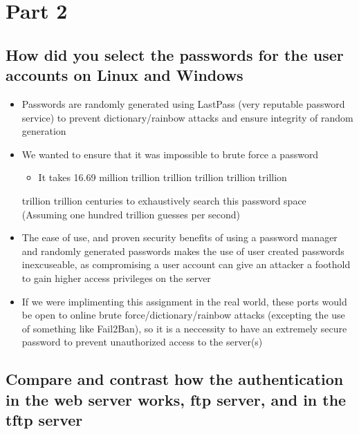 \documentclass[11pt]{article}
\begin{document}
\section{Part 2}
\label{sec-3}
\subsection{How did you select the passwords for the user accounts on Linux and Windows}
\label{sec-3-1}
\begin{itemize}
\item Passwords are randomly generated using LastPass (very reputable password
service) to prevent dictionary/rainbow attacks and ensure integrity of random
generation
\item We wanted to ensure that it was impossible to brute force a password
\begin{itemize}
\item It takes 16.69 million trillion trillion trillion trillion trillion
\end{itemize}
trillion trillion centuries to exhaustively search this password space
(Assuming one hundred trillion guesses per second)
\item The ease of use, and proven security benefits of using a password manager
and randomly generated passwords makes the use of user created passwords
inexcuseable, as compromising a user account can give an attacker a
foothold to gain higher access privileges on the server
\item If we were implimenting this assignment in the real world, these ports
would be open to online brute force/dictionary/rainbow attacks (excepting the use
of something like Fail2Ban), so it is a neccessity to have an extremely
secure password to prevent unauthorized access to the server(s)
\end{itemize}
\subsection{Compare and contrast how the authentication in the web server works, ftp server, and in the tftp server}
\label{sec-3-2}
\end{document}
